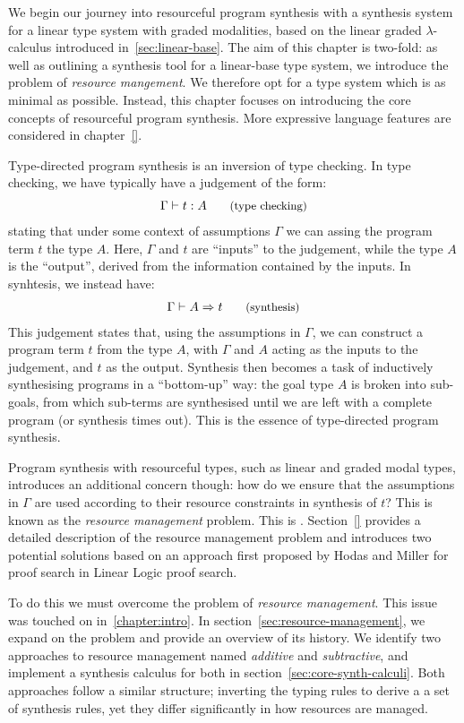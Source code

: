We begin our journey into resourceful program synthesis with a synthesis system
for a linear type system with graded modalities, based on the linear graded
$\lambda$-calculus introduced in~\ref{sec:linear-base}. The aim of this chapter
is two-fold: as well as outlining a synthesis tool for a linear-base type
system, we introduce the problem of \textit{resource mangement}. We therefore
opt for a type system which is as minimal as possible. Instead, this chapter
focuses on introducing the core concepts of resourceful program synthesis. More
expressive language features are considered in chapter~\ref{}. 

Type-directed program synthesis is an inversion of type checking. In
type checking, we have typically have a judgement of the form: 
\begin{align*}
    \Gamma \vdash t : A {\small{\tag{type checking}}}
\end{align*}
stating that under some context of assumptions $\Gamma$ we can assing the 
program term $t$ the type $A$. Here, $\Gamma$ and $t$ are ``inputs'' to the
judgement, while the type $A$ is the ``output'', derived from the information
contained by the inputs. In synhtesis, we instead have:
\begin{align*}
    \Gamma \vdash A \Rightarrow t {\small{\tag{synthesis}}}
\end{align*}
This judgement states that, using the assumptions in $\Gamma$, we can construct
a program term $t$ from the type $A$, with $\Gamma$ and $A$ acting as the inputs
to the judgement, and $t$ as the output. Synthesis then becomes a task of
inductively synthesising programs in a ``bottom-up'' way: the goal type $A$ is
broken into sub-goals, from which sub-terms are synthesised until we are left
with a complete program (or synthesis times out). This is the essence of
type-directed program synthesis. 

Program synthesis with resourceful types, such as linear and graded modal types,
introduces an additional concern though: how do we ensure that the assumptions
in $\Gamma$ are used according to their resource constraints in synthesis of
$t$? This is known as the \textit{resource management} problem. 
This is . Section~\ref{} provides a
detailed description of the resource management problem and introduces two
potential solutions based on an approach first proposed by Hodas and Miller for
proof search in Linear Logic proof search.

To do this we must overcome the problem of \textit{resource management}. This
issue was touched on in~\ref{chapter:intro}. In
section~\ref{sec:resource-management}, we expand on the problem and provide an
overview of its history. We identify two approaches to resource
management named \textit{additive} and \textit{subtractive}, and implement a
synthesis calculus for both in section~\ref{sec:core-synth-calculi}. Both
approaches follow a similar structure; inverting the typing rules to derive a
a set of synthesis rules, yet they differ significantly in how resources are
managed.

